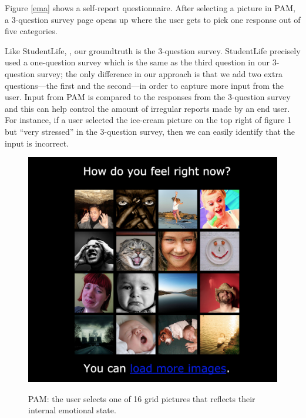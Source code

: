 \documentclass{article}
\begin{document}
Figure \ref{ema} shows a self-report questionnaire. After selecting a picture in PAM, a 3-question survey page opens up where the user gets to pick one response out of five categories. 

Like StudentLife, \cite{wang2014studentlife}, our groundtruth is the 3-question survey. StudentLife precisely used a one-question survey which is the same as the third question in our 3-question survey; the only difference in our approach is that we add two extra questions---the first and the second---in order to capture more input from the user. Input from PAM is compared to the responses from the 3-question survey and this can help control the amount of irregular reports made by an end user. For instance, if a user selected the ice-cream picture on the top right of figure 1 but ``very stressed'' in the 3-question survey, then we can easily identify that the input is incorrect. 


\begin{figure}[ht]
		\centering
		\includegraphics[width=\columnwidth]{pam}
		\label{pam}
		\caption{PAM: the user selects one of 16 grid pictures that reflects their internal emotional state.} 
		\label{pam}
\end{figure} 
\end{document}
